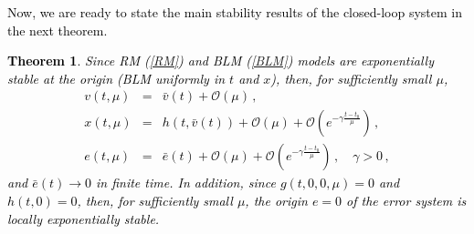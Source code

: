 \documentclass[review]{elsarticle}
\newtheorem{theorem}{Theorem}
\begin{document}
\textcolor{black}{
Now, we are ready to state the main stability results of the closed-loop system in the next theorem. 
%
\begin{theorem} \label{theorem1}
Since RM (\ref{RM}) and BLM (\ref{BLM}) models are exponentially stable at the origin (BLM uniformly in $t$ and $x$), then, for sufficiently small $\mu$,
%
\begin{eqnarray} \label{result1}
v(t,\mu) &=& \bar{v}(t) + \mathcal{O}(\mu)\,, \\
x(t,\mu) &=& h(t, \bar{v}(t)) +  \mathcal{O}(\mu) + \mathcal{O}\left(e^{-\gamma\frac{t-t_0}{\mu}}\right)\,,  \label{result2} \\
e(t,\mu) &=& \bar{e}(t) +  \mathcal{O}(\mu) + \mathcal{O}\left(e^{-\gamma\frac{t-t_0}{\mu}}\right)\,, \quad \gamma>0\,, \label{result3}
\end{eqnarray}
%
and $\bar{e}(t) \to 0$ in finite time. In addition, since $g(t,0,0,\mu)=0$ and $h(t,0)=0$, then, for sufficiently small $\mu$, the origin
$e=0$ of the error system is locally exponentially stable.
%
\end{theorem}
}
%
\end{document}
